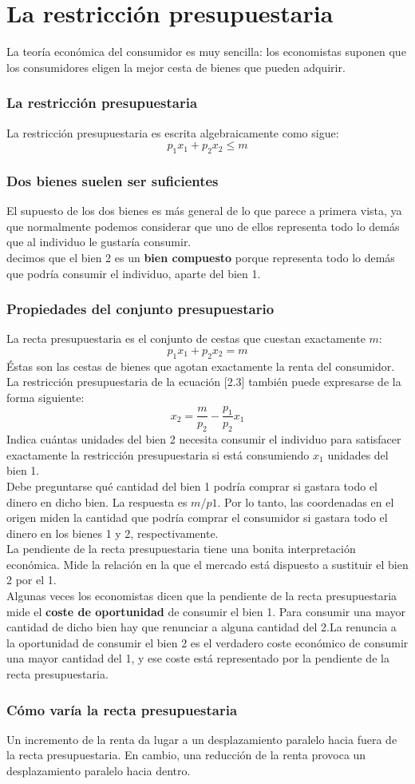 \documentclass[10pt]{article}
\begin{document}
\part*{\center La restricción presupuestaria}
La teoría económica del consumidor es muy sencilla: los economistas suponen que los consumidores eligen la mejor cesta de bienes que pueden adquirir.\\
\section*{La restricción presupuestaria}
La restricción presupuestaria es escrita algebraicamente como sigue:
$$p_1 x_1 + p_2 x_2 \leq m$$
\section*{Dos bienes suelen ser suficientes}
El supuesto de los dos bienes es más general de lo que parece a primera vista, ya que normalmente podemos considerar que uno de ellos representa todo lo demás que al individuo le gustaría consumir.\\
decimos que el bien 2 es un \textbf{bien compuesto} porque representa todo lo demás que podría consumir el individuo, aparte del bien 1. 
\section*{Propiedades del conjunto presupuestario}
La recta presupuestaria es el conjunto de cestas que cuestan exactamente $m$: $$p_1 x_1 + p_2 x_2 = m$$
Éstas son las cestas de bienes que agotan exactamente la renta del consumidor.\\
La restricción presupuestaria de la ecuación [2.3] también puede expresarse de la forma siguiente:
$$x_2=\dfrac{m}{p_2}-\dfrac{p_1}{p_2} x_1$$
Indica cuántas unidades del bien 2 necesita consumir el individuo para satisfacer exactamente la restricción presupuestaria si está consumiendo $x_1$ unidades del bien 1.\\
Debe preguntarse qué cantidad del bien 1 podría comprar si gastara todo el dinero en dicho bien. La respuesta es $m/p1$. Por lo tanto, las coordenadas en el origen miden la cantidad que podría comprar el consumidor si gastara todo el dinero en los bienes 1 y 2, respectivamente.\\
La pendiente de la recta presupuestaria tiene una bonita interpretación económica. Mide la relación en la que el mercado está dispuesto a sustituir el bien 2 por el 1.\\
Algunas veces los economistas dicen que la pendiente de la recta presupuestaria mide el\textbf{ coste de oportunidad} de consumir el bien 1. Para consumir una mayor cantidad de dicho bien hay que renunciar a alguna cantidad del 2.La renuncia a la oportunidad de consumir el bien 2 es el verdadero coste económico de consumir una mayor cantidad del 1, y ese coste está representado por la pendiente de la recta presupuestaria.
\section*{Cómo varía la recta presupuestaria}
Un incremento de la renta da lugar a un desplazamiento paralelo hacia fuera de la recta presupuestaria. En cambio, una reducción de la renta provoca un desplazamiento paralelo hacia dentro.\\
\end{document}
